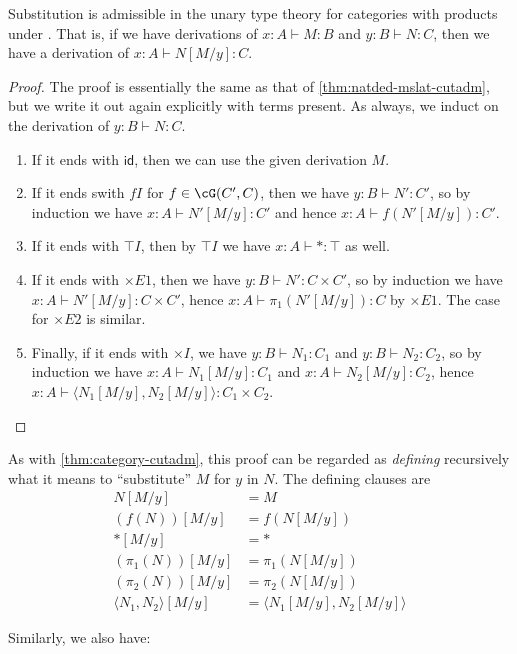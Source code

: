 \documentclass{book}
\def\idfunc{\mathsf{id}}
\let\types\vdash
\def\unit{\top}%
\def\ttt{\mathord{\ast}}%
\def\timesE{\ensuremath{\mathord{\times}E}}
\def\timesI{\ensuremath{\mathord{\times}I}}
\def\pair#1#2{\langle #1,#2\rangle}
\begin{document}
\begin{thm}\label{thm:catprod-subadm}
  Substitution is admissible in the unary type theory for categories with products under \cG.
  That is, if we have derivations of $x:A\types M:B$ and $y:B \types N:C$, then we have a derivation of $x:A \types N[M/y]:C$.
\end{thm}
\begin{proof}
  The proof is essentially the same as that of \cref{thm:natded-mslat-cutadm}, but we write it out again explicitly with terms present.
  As always, we induct on the derivation of $y:B \types N:C$.
  \begin{enumerate}
  \item If it ends with $\idfunc$, then we can use the given derivation $M$.
  \item If it ends swith $fI$ for $f\in \cG(C',C)$, then we have $y:B \types N':C'$, so by induction we have $x:A\types N'[M/y]:C'$ and hence $x:A\types f(N'[M/y]):C'$.
  \item If it ends with $\unit I$, then by $\unit I$ we have $x:A \types \ttt:\unit$ as well.
  \item If it ends with $\timesE1$, then we have $y:B\types N':C\times C'$, so by induction we have $x:A \types N'[M/y]:C\times C'$, hence $x:A \types \pi_1(N'[M/y]):C$ by $\timesE1$.
    The case for $\timesE2$ is similar.
  \item Finally, if it ends with $\timesI$, we have $y:B\types N_1:C_1$ and $y:B\types N_2:C_2$, so by induction we have $x:A \types N_1[M/y]:C_1$ and $x:A \types N_2[M/y]:C_2$, hence $x:A \types \pair{N_1[M/y]}{N_2[M/y]}:C_1\times C_2$.\qedhere
  \end{enumerate}
\end{proof}

As with \cref{thm:category-cutadm}, this proof can be regarded as \emph{defining} recursively what it means to ``substitute'' $M$ for $y$ in $N$.
The defining clauses are
\begin{align*}
  N[M/y] &= M\\
  (f(N))[M/y] &= f(N[M/y])\\
  \ttt[M/y] &= \ttt\\
  (\pi_1(N))[M/y] &= \pi_1(N[M/y])\\
  (\pi_2(N))[M/y] &= \pi_2(N[M/y])\\
  \pair{N_1}{N_2}[M/y] &= \pair{N_1[M/y]}{N_2[M/y]}
\end{align*}

Similarly, we also have:
\end{document}
